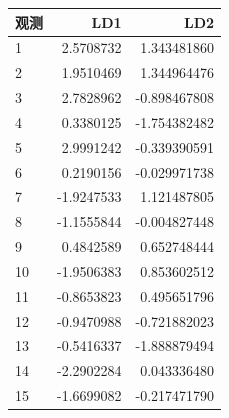 \par\addvspace{5pt}\begin{center}\begin{minipage}{\linewidth}\centering
\small
{}
\begin{tabular}{lrr}\toprule
{\bfseries 观测 }&{\bfseries  LD1 }&{\bfseries  LD2}\\\midrule
1 & 2.5708732 & 1.343481860\\
2 & 1.9510469 & 1.344964476\\
3 & 2.7828962 & -0.898467808\\
4 & 0.3380125 & -1.754382482\\
5 & 2.9991242 & -0.339390591\\
6 & 0.2190156 & -0.029971738\\
7 & -1.9247533 & 1.121487805\\
8 & -1.1555844 & -0.004827448\\
9 & 0.4842589 & 0.652748444\\
10 & -1.9506383 & 0.853602512\\
11 & -0.8653823 & 0.495651796\\
12 & -0.9470988 & -0.721882023\\
13 & -0.5416337 & -1.888879494\\
14 & -2.2902284 & 0.043336480\\
15 & -1.6699082 & -0.217471790\\
\bottomrule\end{tabular}
\end{minipage}\end{center}

